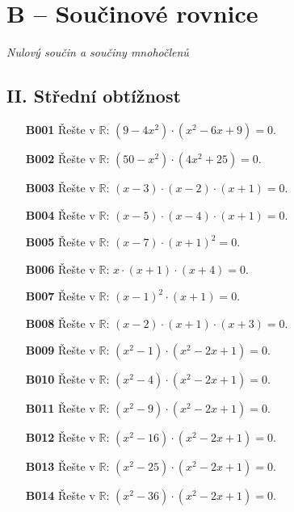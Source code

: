 \documentclass[11pt,a4paper]{article}
\begin{document}
\section*{B -- Součinové rovnice}
\textit{Nulový součin a součiny mnohočlenů}
\subsection*{II. Střední obtížnost}
\begin{enumerate}[label={},itemsep=5pt]
\item[\textbf{B001}] Řešte v $\mathbb R$: $\left(9 - 4x^{2}\right) \cdot \left(x^{2} - 6x + 9\right)=0$. 
\item[\textbf{B002}] Řešte v $\mathbb R$: $\left(50 - x^{2}\right) \cdot \left(4x^{2} + 25\right)=0$. 
\item[\textbf{B003}] Řešte v $\mathbb R$: $\left(x - 3\right) \cdot \left(x - 2\right) \cdot \left(x + 1\right)=0$.
\item[\textbf{B004}] Řešte v $\mathbb R$: $\left(x - 5\right) \cdot \left(x - 4\right) \cdot \left(x + 1\right)=0$.
\item[\textbf{B005}] Řešte v $\mathbb R$: $\left(x - 7\right) \cdot \left(x + 1\right)^{2}=0$.
\item[\textbf{B006}] Řešte v $\mathbb R$: $x \cdot \left(x + 1\right) \cdot \left(x + 4\right)=0$.
\item[\textbf{B007}] Řešte v $\mathbb R$: $\left(x - 1\right)^{2} \cdot \left(x + 1\right)=0$.
\item[\textbf{B008}] Řešte v $\mathbb R$: $\left(x - 2\right) \cdot \left(x + 1\right) \cdot \left(x + 3\right)=0$.
\item[\textbf{B009}] Řešte v $\mathbb R$: $\left(x^{2} - 1\right) \cdot \left(x^{2} - 2x + 1\right)=0$.
\item[\textbf{B010}] Řešte v $\mathbb R$: $\left(x^{2} - 4\right) \cdot \left(x^{2} - 2x + 1\right)=0$.
\item[\textbf{B011}] Řešte v $\mathbb R$: $\left(x^{2} - 9\right) \cdot \left(x^{2} - 2x + 1\right)=0$.
\item[\textbf{B012}] Řešte v $\mathbb R$: $\left(x^{2} - 16\right) \cdot \left(x^{2} - 2x + 1\right)=0$.
\item[\textbf{B013}] Řešte v $\mathbb R$: $\left(x^{2} - 25\right) \cdot \left(x^{2} - 2x + 1\right)=0$.
\item[\textbf{B014}] Řešte v $\mathbb R$: $\left(x^{2} - 36\right) \cdot \left(x^{2} - 2x + 1\right)=0$.
\end{enumerate}
\end{document}
